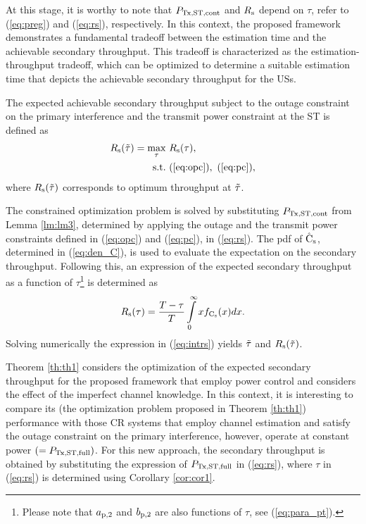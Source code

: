 {At this stage, it is worthy to note that $P_{\text{Tx,ST,cont}}$ and $R_{\text{s}}$ depend on $\tau$, refer to (\ref{eq:preg}) and (\ref{eq:rs}), respectively. In this context, the proposed framework demonstrates a fundamental tradeoff between the estimation time and the achievable secondary throughput. This tradeoff is characterized as the estimation-throughput tradeoff, which can be optimized to determine a suitable estimation time that depicts the achievable secondary throughput for the USs. 
\begin{theorem} \label{th:th1}
\normalfont
The expected achievable secondary throughput subject to the outage constraint on the primary interference and the transmit power constraint at the ST is defined as
\begin{align}
R_{\text{s}}(\tilde{\tau}) = \operatorname*{max}_{\tau}  & \text{      } {R_{\text{s}}(\tau)}, 
 \label{eq:sys} \\
\text{s.t.} & \text{ } (\ref{eq:opc}), \text{  } (\ref{eq:pc}), \nonumber 
 \end{align}
where $R_{\text{s}}(\tilde{\tau})$ corresponds to optimum throughput at $\tilde{\tau}$.  
\end{theorem}
\begin{IEEEproof}
The constrained optimization problem is solved by substituting $P_{\text{Tx,ST,cont}}$ from Lemma \ref{lm:lm3}, determined by applying the outage and the transmit power constraints defined in (\ref{eq:opc}) and (\ref{eq:pc}), in (\ref{eq:rs}). 
The pdf of $\hat{\text{{C}}}_{\text{s}}$, determined in (\ref{eq:den_C}), is used to evaluate the expectation on the secondary throughput. Following this, an expression of the expected secondary throughput as a function of $\tau$\footnote{Please note that $a_{\text{p,2}}$ and $b_{\text{p,2}}$ are also functions of $\tau$, see (\ref{eq:para_pt}).} is determined as
\begin{equation}
R_{\text{s}}(\tau) = \frac{T - \tau}{T} \int\limits_{0}^{\infty} x f_{\text{C}_{\text{s}}}(x) dx. \label{eq:intrs}
\end{equation}
Solving numerically the expression in (\ref{eq:intrs}) yields $\tilde{\tau}$ and $R_{\text{s}}(\tilde{\tau})$. 
\end{IEEEproof}
\begin{coro} \label{cor:cor2}
\normalfont
Theorem \ref{th:th1} considers the optimization of the expected secondary throughput for the proposed framework that employ power control and considers the effect of the imperfect channel knowledge. In this context, it is interesting to compare its (the optimization problem proposed in Theorem \ref{th:th1}) performance with those CR systems that employ channel estimation and satisfy the outage constraint on the primary interference, however, operate at constant power $(= P_{\text{Tx,ST,full}})$. For this new approach, the secondary throughput is obtained by substituting the expression of $P_{\text{Tx,ST,full}}$ in (\ref{eq:rs}), where $\tau$ in (\ref{eq:rs}) is determined using Corollary \ref{cor:cor1}. 
\end{coro}

}
